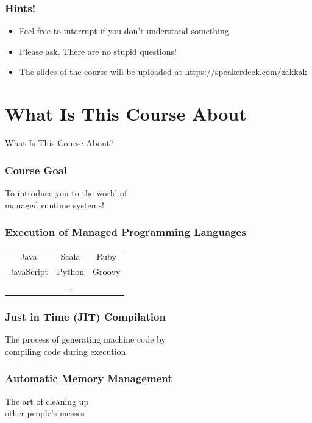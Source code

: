 \documentclass[
14pt,
aspectratio=169,
usenames,
dvipsnames,
x11names]{beamer}
\begin{document}
\begin{frame}
  \frametitle{Hints!}
  \begin{itemize} \setlength{\itemsep}{\fill}
  \item Feel free to \alert{interrupt} if you don't understand something
  \item Please ask. \alert{There are no stupid questions}!
  \item The slides of the course will be uploaded at \url{https://speakerdeck.com/zakkak}
  \end{itemize}
\end{frame}

\section{What Is This Course About}

\begin{frame}
  \centering
  \Large
  What Is This Course About?
\end{frame}

\begin{frame}
  \frametitle{Course Goal}
  \centering
  To introduce you to the world of\\
  managed runtime systems!
\end{frame}

\begin{frame}
  \frametitle{Execution of Managed Programming Languages}
  \centering
  \def\arraystretch{2}
  \setlength\tabcolsep{2em}
  \begin{tabular}{c c c}
    Java       & Scala  & Ruby   \\
    JavaScript & Python & Groovy \\
               & ...    &        \\
  \end{tabular}
\end{frame}

\begin{frame}
  \frametitle{Just in Time (JIT) Compilation}
  \centering
  The process of generating machine code by\\
  compiling code \alert{during execution}
\end{frame}

\begin{frame}
  \frametitle{Automatic Memory Management}
  \centering
  The \alert{art} of cleaning up\\
  other people's messes
\end{frame}
\end{document}

